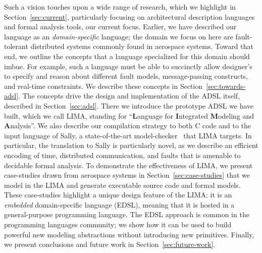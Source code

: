Such a vision touches upon a wide range of research, which we highlight in
Section~\ref{sec:current}, particularly focusing on architectural description
languages and formal analysis tools, our current focus. Earlier, we have
described our language as an \emph{domain-specific} language; the domain we
focus on here are fault-tolerant distributed systems commonly found in aerospace
systems. Toward that end, we outline the concepts that a language specialized
for this domain should imbue. For example, such a language must be able to succinctly allow designer's to specify and reason about different fault models, message-passing constructs, and real-time constraints. We describe these concepts in Section~\ref{sec:towards-adsl}. The concepts drive the design and implementation of the ADSL itself, described in Section~\ref{sec:adsl}. There we introduce the prototype ADSL we have built, which we call LIMA, standing for ``\textbf{L}anguage for \textbf{I}ntegrated \textbf{M}odeling and \textbf{A}nalysis''. We also describe our compilation strategy to both C code and to the input language of Sally, a state-of-the-art model-checker~\cite{sally} that LIMA targets. In particular, the translation to Sally is particularly novel, as we describe an efficient encoding of time, distributed communication, and faults that is amenable to decidable formal analysis. To demonstrate the effectiveness of LIMA, we present case-studies drawn from aerospace systems in Section~\ref{sec:case-studies} that we model in the LIMA and generate executable source code and formal models. These case-studies highlight a unique design feature of the LIMA: it is an \emph{embedded} domain-specific language (EDSL), meaning that it is hosted in a general-purpose programming language. The EDSL approach is common in the programming languages community; we show how it can be used to build powerful new modeling abstractions without introducing new primitives.
 Finally, we present conclusions and future work in Section~\ref{sec:future-work}.



